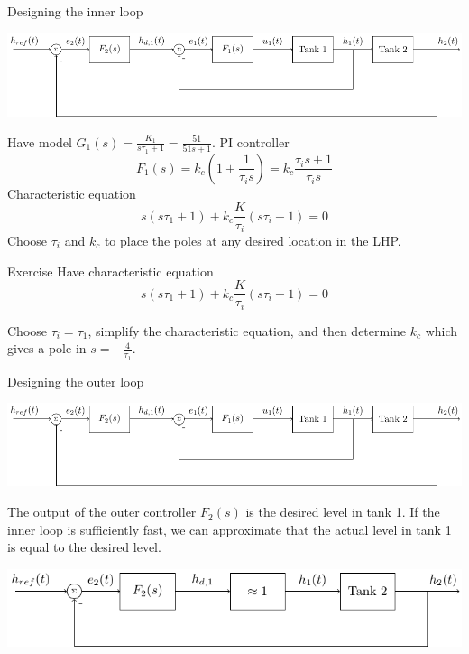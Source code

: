 \documentclass[presentation,aspectratio=169, usenames, dvipsnames]{beamer}
\begin{document}
\begin{frame}[label={sec:orga520990}]{Designing the inner loop}
\begin{center}
\includegraphics[width=0.6\linewidth]{../../figures/block-diagram-cascade-control.pdf}
\end{center}
Have model \(G_1(s) = \frac{K_1}{s\tau_1 + 1} = \frac{51}{51s + 1}\). PI controller \[F_1(s) = k_{c} \left( 1 + \frac{1}{\tau_{i}s}\right) = k_{c} \frac{\tau_{i}s + 1}{\tau_{i}s}\]
Characteristic equation
\[ s(s\tau_1 + 1) + k_c \frac{K}{\tau_{i}}(s\tau_{i} + 1) = 0\]
Choose \(\tau_i\) and \(k_c\) to place the poles at any desired location in the LHP. 
\end{frame}

\begin{frame}[label={sec:org5bdecd0}]{Exercise}
Have characteristic equation
\[ s(s\tau_1 + 1) + k_c \frac{K}{\tau_{i}}(s\tau_{i} + 1) = 0\]

\alert{Choose \(\tau_i = \tau_1\), simplify the characteristic equation, and then determine \(k_c\) which gives a pole in \(s=-\frac{4}{\tau_1}\).}
\end{frame}

\begin{frame}[label={sec:orga795158}]{Designing the outer loop}
\begin{center}
\includegraphics[width=0.6\linewidth]{../../figures/block-diagram-cascade-control.pdf}
\end{center}
The output of the outer controller \(F_2(s)\) is the desired level in tank 1. If the inner loop is sufficiently fast, we can approximate that the actual level in tank 1 is equal to the desired level. 

\begin{center}
\includegraphics[width=0.9\linewidth]{../../figures/block-diagram-cascade-outer-loop}
\end{center}
\end{frame}
\end{document}
